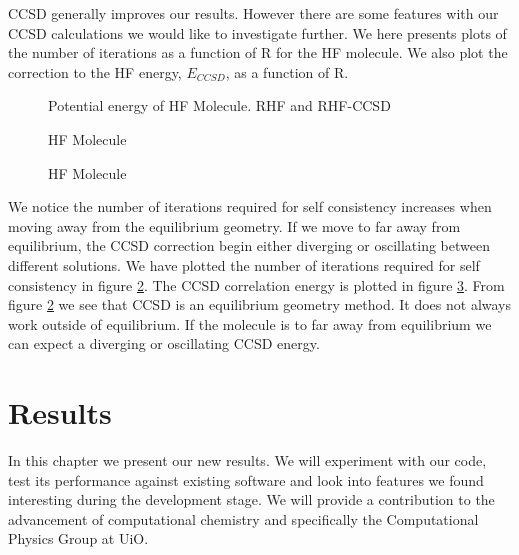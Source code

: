 CCSD generally improves our results. However there are some features
with our CCSD calculations we would like to investigate further. We
here presents plots of the number of iterations as a function of R for
the HF molecule. We also plot the correction to the HF energy,
$E_{CCSD}$, as a function of R. \\


\begin{figure}[h!]
\begin{center}
\caption{Potential energy of HF Molecule. RHF and RHF-CCSD}
\label{fig:hfpoten}
\end{center}
\end{figure}

\newpage

\begin{figure}[h!]
\begin{center}
\caption{HF Molecule}
\label{fig:hfiter}
\end{center}
\end{figure}

\begin{figure}[h!]
\begin{center}
\caption{HF Molecule}
\label{fig:hfcorr}
\end{center}
\end{figure}

We notice the number of iterations required for self consistency
increases when moving away from the equilibrium geometry. If we move to
far away from equilibrium, the CCSD correction begin either diverging or oscillating
between different solutions. We have plotted the number of iterations required
for self consistency in figure \ref{fig:hfiter}. The CCSD correlation
energy is plotted in figure \ref{fig:hfcorr}. From figure
\ref{fig:hfiter} we see that CCSD is an equilibrium geometry
method. It does not always work outside of equilibrium. If the
molecule is to far away from equilibrium we can expect a diverging or
oscillating CCSD energy.

\chapter{Results}
In this chapter we present our new results. We will experiment with
our code, test its performance against existing software and look into
features we found interesting during the development stage. We will provide a
contribution to the advancement of computational chemistry and
specifically the Computational Physics Group at UiO.


